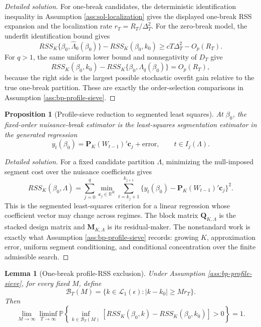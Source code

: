 \documentclass[12pt]{article}
\numberwithin{equation}{section}
\newtheorem{proposition}{Proposition}
\newtheorem{lemma}{Lemma}
\theoremstyle{definition}
\newcommand{\R}{\mathbb R}
\newcommand{\Pp}{\mathbb P}
\begin{document}
\begin{proof}[Detailed solution]
For one-break candidates, the deterministic identification inequality in
Assumption \ref{ass:sol-localization} gives the displayed one-break RSS
expansion and the localization rate \(r_T=R_T/\Delta_T^2\).  For the zero-break
model, the underfit identification bound gives
\[
    RSS_K\{\beta_0,\widehat\Lambda_0(\beta_0)\}-RSS_K(\beta_0,k_0)
    \geq cT\Delta_T^2-O_p(R_T).
\]
For \(q>1\), the same uniform lower bound and nonnegativity of \(D_T\) give
\[
    RSS_K(\beta_0,k_0)-RSS_K\{\beta_0,\widehat\Lambda_q(\beta_0)\}=O_p(R_T),
\]
because the right side is the largest possible stochastic overfit gain relative
to the true one-break partition.  These are exactly the order-selection
comparisons in Assumption \ref{ass:bp-profile-sieve}.
\end{proof}
\begin{proposition}[Profile-sieve reduction to segmented least squares]
\label{prop:bp-profile-reduction}
At \(\beta_0\), the fixed-order nuisance-break estimator is the least-squares
segmentation estimator in the generated regression
\[
    y_t(\beta_0)=\bm P_K(W_{t-1})'\bm c_j+\text{error},
    \qquad t\in I_j(\Lambda).
\]
\end{proposition}

\begin{proof}[Detailed solution]
For a fixed candidate partition \(\Lambda\), minimizing the null-imposed
segment cost over the nuisance coefficients gives
\[
    RSS_K(\beta_0,\Lambda)
    =
    \sum_{j=0}^{q}
    \min_{\bm c_j\in\R^K}
    \sum_{t=k_j+1}^{k_{j+1}}
    \{y_t(\beta_0)-\bm P_K(W_{t-1})'\bm c_j\}^2.
\]
This is the segmented least-squares criterion for a linear regression whose
coefficient vector may change across regimes.  The block matrix
\(\bm Q_{K,\Lambda}\) is the stacked design matrix and
\(\bm M_{K,\Lambda}\) is its residual-maker.  The nonstandard work is exactly
what Assumption \ref{ass:bp-profile-sieve} records: growing \(K\), approximation
error, uniform segment conditioning, and conditional concentration over the
finite admissible search.
\end{proof}

\begin{lemma}[One-break profile-RSS exclusion]
\label{lem:wb-bp-fixed-exclusion}
Under Assumption \ref{ass:bp-profile-sieve}, for every fixed \(M\), define
\[
    \mathcal B_T(M)
    =\{k\in\mathcal L_1(\epsilon): |k-k_0|\geq Mr_T\}.
\]
Then
\[
    \lim_{M\to\infty}\liminf_{T\to\infty}
    \Pp\left\{
      \inf_{k\in\mathcal B_T(M)}
      [RSS_K(\beta_0,k)-RSS_K(\beta_0,k_0)]>0
    \right\}=1.
\]
\end{lemma}
\end{document}
